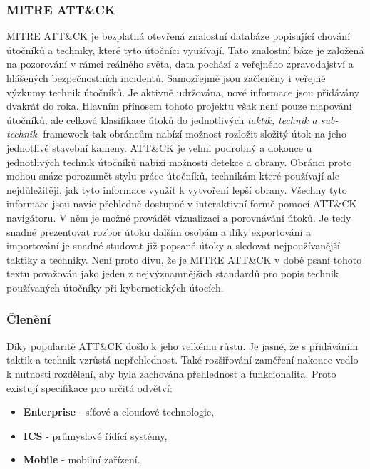 \subsubsection{MITRE ATT\&CK}
MITRE ATT\&CK je bezplatná otevřená znalostní databáze popisující chování útočníků a techniky, které tyto útočníci využívají.
Tato znalostní báze je založená na pozorování v rámci reálného světa, data pochází z veřejného zpravodajství a hlášených bezpečnostních incidentů.
Samozřejmě jsou začleněny i veřejné výzkumy technik útočníků.
Je aktivně udržována, nové informace jsou přidávány dvakrát do roka\cite{mitre_attack_framework_faq}.
Hlavním přínosem tohoto projektu však není pouze mapování útočníků, ale celková klasifikace útoků do jednotlivých \textit{taktik, technik a sub-technik}.
framework tak obráncům nabízí možnost rozložit složitý útok na jeho jednotlivé stavební kameny.
ATT\&CK je velmi podrobný a dokonce u jednotlivých technik útočníků nabízí možnosti detekce a obrany.
Obránci proto mohou snáze porozumět stylu práce útočníků, technikám které používají ale nejdůležitěji, jak tyto informace využít k vytvoření lepší obrany.
Všechny tyto informace jsou navíc přehledně dostupné v interaktivní formě pomocí ATT\&CK navigátoru\cite{mitre_attack_navigator}.
V něm je možné provádět vizualizaci a porovnávání útoků.
Je tedy snadné prezentovat rozbor útoku dalším osobám a díky exportování a importování je snadné studovat již popsané útoky a sledovat nejpoužívanější taktiky a techniky.
Není proto divu, že je MITRE ATT\&CK v době psaní tohoto textu považován jako jeden z nejvýznamnějších standardů pro popis technik používaných útočníky při kybernetických útocích.\cite{mitre_attack_framework}


\subsubsection{Členění}
Díky popularitě ATT\&CK došlo k jeho velkému růstu.
Je jasné, že s přidáváním taktik a technik vzrůstá nepřehlednost.
Také rozšiřování zaměření nakonec vedlo k nutnosti rozdělení, aby byla zachována přehlednost a funkcionalita.
Proto existují specifikace pro určitá odvětví:

\begin{itemize}
	\item \textbf{Enterprise} - síťové a cloudové technologie,
	\item \textbf{ICS} - průmyslové řídící systémy,
	\item \textbf{Mobile} - mobilní zařízení.
\end{itemize}

